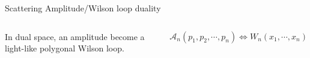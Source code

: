\documentclass[10pt]{beamer}
\begin{document}
\begin{frame}[fragile]{Scattering Amplitude/Wilson loop duality}
\begin{columns}
In dual space, an amplitude become a light-like polygonal Wilson loop. 

\begin{equation*}
  \mathcal{A}_{n}(p_{1},p_{2},\cdots,p_{n}) \Leftrightarrow W_{n}(x_{1},\cdots,x_{n})
\end{equation*}



\end{columns}



    
    



\end{frame}
\end{document}
